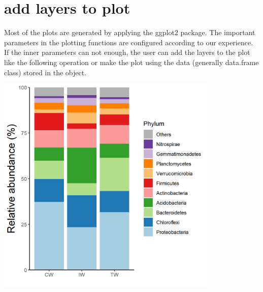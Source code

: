 \documentclass[
]{book}
\newenvironment{Shaded}{\begin{snugshade}}{\end{snugshade}}
\newcommand{\AttributeTok}[1]{\textcolor[rgb]{0.77,0.63,0.00}{#1}}
\newcommand{\CommentTok}[1]{\textcolor[rgb]{0.56,0.35,0.01}{\textit{#1}}}
\newcommand{\ConstantTok}[1]{\textcolor[rgb]{0.00,0.00,0.00}{#1}}
\newcommand{\DecValTok}[1]{\textcolor[rgb]{0.00,0.00,0.81}{#1}}
\newcommand{\FunctionTok}[1]{\textcolor[rgb]{0.00,0.00,0.00}{#1}}
\newcommand{\NormalTok}[1]{#1}
\newcommand{\OtherTok}[1]{\textcolor[rgb]{0.56,0.35,0.01}{#1}}
\newcommand{\SpecialCharTok}[1]{\textcolor[rgb]{0.00,0.00,0.00}{#1}}
\newcommand{\StringTok}[1]{\textcolor[rgb]{0.31,0.60,0.02}{#1}}
\begin{document}
\hypertarget{add-layers-to-plot}{%
\section{add layers to plot}\label{add-layers-to-plot}}

Most of the plots are generated by applying the ggplot2 package.
The important parameters in the plotting functions are configured according to our experience.
If the inner parameters can not enough, the user can add the layers to the plot like the following operation or
make the plot using the data (generally data.frame class) stored in the object.

\begin{Shaded}
\end{Shaded}

\begin{center}\includegraphics[width=400px]{Images/plot_bar_mean_classic} \end{center}
\end{document}
